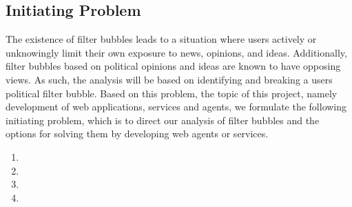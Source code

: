 \subsection*{Initiating Problem} The existence of filter bubbles leads to a
situation where users actively or unknowingly limit their own exposure to news,
opinions, and ideas. Additionally, filter bubbles based on political opinions
and ideas are known to have opposing views. As such, the analysis will be based
on identifying and breaking a users political filter bubble. Based on this
problem, the topic of this project, namely development of web applications,
services and agents, we formulate the following initiating problem, which is to
direct our analysis of filter bubbles and the options for solving them by
developing web agents or services.


\begin{center}
\begin{minipage}{0.95\linewidth}

\begin{enumerate}
  \item {}
  
  \item {}
  
  \item {}
  
  \item {}
  
\end{enumerate}

\end{minipage}
\end{center}


